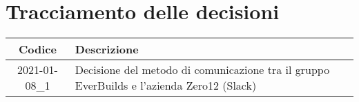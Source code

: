 \section*{Tracciamento delle decisioni}

\begin{center}
	\begin{longtable}{|c|p{12.25cm}|}
	\hline
	\rowcolor{lighter-grayer}
	\textbf{Codice} & \textbf{Descrizione} \\
	\hline
	\endfirsthead

	\hline
	2021-01-08\_1 & Decisione del metodo di comunicazione tra il gruppo EverBuilds e l'azienda Zero12 (Slack)\\
	\hline
	\end{longtable}
\end{center}
